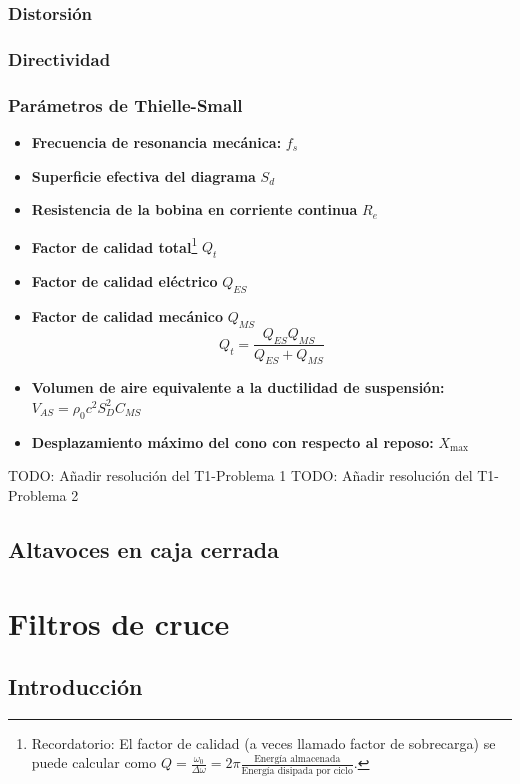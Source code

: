 \documentclass[12pt, a4paper]{article}
\begin{document}
\subsubsection{Distorsión}
\subsubsection{Directividad}
\subsubsection{Parámetros de Thielle-Small}

\begin{itemize}
  \item \textbf{Frecuencia de resonancia mecánica:} $f_s$
  \item \textbf{Superficie efectiva del diagrama} $S_d$
  \item \textbf{Resistencia de la bobina en corriente continua} $R_e$
  \item \textbf{Factor de calidad total}\footnote{Recordatorio: El factor de calidad (a veces llamado factor de sobrecarga) se puede calcular como $Q= \frac{\omega_0}{\Delta \omega} = 2\pi \frac{\text{Energía almacenada}}{\text{Energía disipada por ciclo}}$.} $Q_t$
  \item \textbf{Factor de calidad eléctrico} $Q_{ES}$
  \item \textbf{Factor de calidad mecánico} $Q_{MS}$
        \[ Q_t = \frac{Q_{ES}Q_{MS}}{Q_{ES} + Q_{MS}} \]
  \item \textbf{Volumen de aire equivalente a la ductilidad de suspensión:} $V_{AS} = \rho_0c^2S_D^2C_{MS}$
  \item \textbf{Desplazamiento máximo del cono con respecto al reposo:} $X_{\text{max}}$
\end{itemize}

TODO: Añadir resolución del T1-Problema 1
TODO: Añadir resolución del T1-Problema 2

\subsection{Altavoces en caja cerrada}

\newpage
\section{Filtros de cruce}

\subsection{Introducción}
\end{document}
